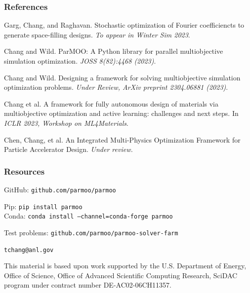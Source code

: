 \documentclass[aspectratio=169]{beamer}
\begin{document}
\begin{frame}
\frametitle{References}

{\small\it

Garg, Chang, and Raghavan.
Stochastic optimization of Fourier coefficiencts to generate space-filling designs.
{\sl To appear in Winter Sim 2023}.

\medskip


Chang and Wild.
ParMOO: A Python library for parallel multiobjective simulation optimization.
{\sl JOSS 8(82):4468 (2023)}.

\medskip

Chang and Wild.
Designing a framework for solving multiobjective simulation optimization problems.
{\sl Under Review, ArXiv preprint 2304.06881 (2023)}.

\medskip

Chang et al.
A framework for fully autonomous design of materials via multiobjective optimization and active learning: challenges and next steps.
In {\sl ICLR 2023, Workshop on ML4Materials}.

\medskip

Chen, Chang, et al.
An Integrated Multi-Physics Optimization Framework for Particle Accelerator Design.
{\sl Under review.}

}

\end{frame}

\begin{frame}\frametitle{Resources}
\begin{center}
{\large
GitHub: {\tt github.com/parmoo/parmoo}

\medskip

Pip: {\tt pip install parmoo}\\
Conda: {\tt conda install --channel=conda-forge parmoo}}

\bigskip
\bigskip

Test problems: {\tt github.com/parmoo/parmoo-solver-farm}

\bigskip
\bigskip

{\tt tchang@anl.gov}

\vfill

{\tiny This material is based upon work supported by the U.S. Department of Energy, Office of Science, Office of Advanced Scientific Computing Research, SciDAC program under contract number DE-AC02-06CH11357.\\}

\end{center}
\end{frame}
\end{document}

